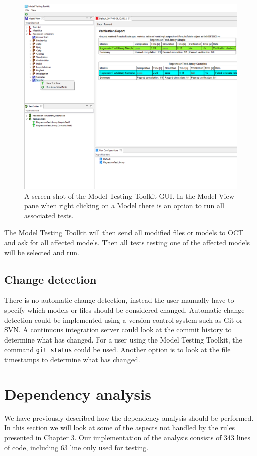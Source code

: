 \documentclass{cslthse-msc}
\begin{document}
\begin{figure}[!hbtp]
    \includegraphics[width=1.0\textwidth]{Pictures/MTT_Capture.png}
    \caption{A screen shot of the Model Testing Toolkit GUI. In the Model View pane when right clicking on a Model there is an option to run all associated tests.}
    \label{fig:MTTrun}
\end{figure}

The Model Testing Toolkit will then send all modified files or models to OCT and ask for all affected models. Then all tests testing one of the affected models will be selected and run.

\subsection{Change detection}
There is no automatic change detection, instead the user manually have to specify which models or files should be considered changed. Automatic change detection could be implemented using a version control system such as Git or SVN. A continuous integration server could look at the commit history to determine what has changed. For a user using the Model Testing Toolkit, the command \texttt{git status} could be used. Another option is to look at the file timestamps to determine what has changed.

\section{Dependency analysis}
We have previously described how the dependency analysis should be performed. In this section we will look at some of the aspects not handled by the rules presented in Chapter 3. Our implementation of the analysis consists of 343 lines of code, including 63 line only used for testing.
\end{document}
